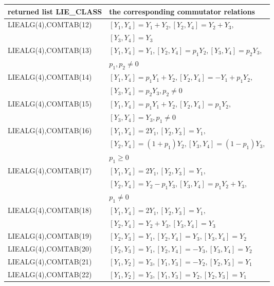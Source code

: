 \hspace*{0.3cm}\begin{tabular}{l|l}returned list LIE\_CLASS&
the corresponding commutator relations\\[0.1cm]\hline
{LIEALG(4),COMTAB(12)}&$[Y_1,Y_4]=Y_1+Y_2,[Y_2,Y_4]=Y_2+Y_3,$\\
                      &$[Y_3,Y_4]=Y_3$\\[0.1cm]
{LIEALG(4),COMTAB(13)}&$[Y_1,Y_4]=Y_1,[Y_2,Y_4]=p_1 Y_2,[Y_3,Y_4]=p_2 Y_3,$\\
                      &$p_1,p_2\neq 0$\\[0.1cm]
{LIEALG(4),COMTAB(14)}&$[Y_1,Y_4]=p_1 Y_1+Y_2,[Y_2,Y_4]=-Y_1+p_1 Y_2,$\\
                      &$[Y_3,Y_4]=p_2 Y_3,p_2\neq 0$\\[0.1cm]
{LIEALG(4),COMTAB(15)}&$[Y_1,Y_4]=p_1 Y_1+Y_2,[Y_2,Y_4]=p_1 Y_2,$\\
                      &$[Y_3,Y_4]=Y_3,p_1\neq 0$\\[0.1cm]
{LIEALG(4),COMTAB(16)}&$[Y_1,Y_4]=2 Y_1,[Y_2,Y_3]=Y_1,$\\
                      &$[Y_2,Y_4]=(1+p_1) Y_2,[Y_3,Y_4]=(1-p_1) Y_3,$\\
                      &$p_1\geq 0$\\[0.1cm]
{LIEALG(4),COMTAB(17)}&$[Y_1,Y_4]=2 Y_1,[Y_2,Y_3]=Y_1,$\\
                      &$[Y_2,Y_4]=Y_2-p_1 Y_3,[Y_3,Y_4]=p_1 Y_2+Y_3,$\\
                      &$p_1\neq 0$\\[0.1cm]
{LIEALG(4),COMTAB(18)}&$[Y_1,Y_4]=2 Y_1,[Y_2,Y_3]=Y_1,$\\
                      &$[Y_2,Y_4]=Y_2+Y_3,[Y_3,Y_4]=Y_3$\\[0.1cm]
{LIEALG(4),COMTAB(19)}&$[Y_2,Y_3]=Y_1,[Y_2,Y_4]=Y_3,[Y_3,Y_4]=Y_2$\\[0.1cm]
{LIEALG(4),COMTAB(20)}&$[Y_2,Y_3]=Y_1,[Y_2,Y_4]=-Y_3,[Y_3,Y_4]=Y_2$\\[0.1cm]
{LIEALG(4),COMTAB(21)}&$[Y_1,Y_2]=Y_3,[Y_1,Y_3]=-Y_2,[Y_2,Y_3]=Y_1$\\[0.1cm]
{LIEALG(4),COMTAB(22)}&$[Y_1,Y_2]=Y_3,[Y_1,Y_3]=Y_2,[Y_2,Y_3]=Y_1$
\end{tabular}



